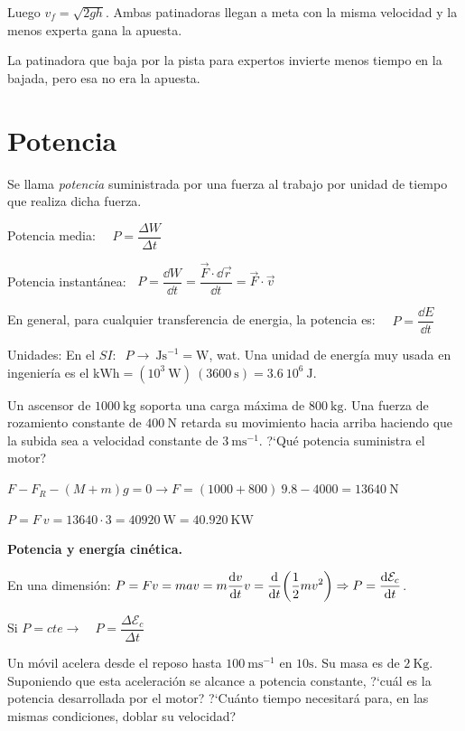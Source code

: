 Luego $v_f=\sqrt{2gh}$. Ambas patinadoras llegan a meta con la misma velocidad y la menos experta gana la apuesta.

\textcolor{gris}{La patinadora que baja por la pista para expertos invierte menos tiempo en la bajada, pero esa no era la apuesta.}

\section{Potencia}

Se llama \emph{potencia} suministrada por una fuerza al trabajo por unidad de tiempo que realiza dicha fuerza. 

Potencia media: $\quad P=\dfrac{\Delta W}{\Delta t}$

Potencia instantánea: $\;\; P=\dfrac {\dd W}{\dd t}=\dfrac {\vec F \cdot \dd \vec r}{\dd t}=\vec F \cdot \vec v$

En general, para cualquier transferencia de energia, la potencia es: $\quad P=\dfrac{\dd E}{\dd t}$

Unidades: En el $SI:\;\; P\to  \ \mathrm{J s}^{-1} = \mathrm{W}$, wat. Una unidad de energía muy usada en ingeniería es el $\mathrm{kWh}=(10^3\ \mathrm{W})\ (3600\ \mathrm{s})=3.6\ 10^6 \ \mathrm{J}$.

\begin{ejem}
Un ascensor de $1000\ \mathrm{kg}$ soporta una carga máxima de $800 \ \mathrm{kg}$. Una fuerza de rozamiento constante de $400 \ \mathrm{N}$ retarda su movimiento hacia arriba haciendo que la subida sea a velocidad constante de $3 \ \mathrm{ms}^{-1}$. ?`Qué potencia suministra el motor?	
\end{ejem}
$F-F_R-(M+m)g=0 \to F=(1000+800)\ 9.8-4000=13640\ \mathrm{N}$

$P=F\ v=13640 \cdot 3 = 40920 \ \mathrm{W}= 40.920 \ \mathrm{KW}$

\textbf{Potencia y energía cinética.}

En una dimensión: $\displaystyle P=Fv=mav = m \dv{v}{t} v =\dv{t}(\dfrac 1 2 mv^2)\Rightarrow P=\dv{\mathcal E_c}{t}$.

Si $P=cte \to \quad P=\dfrac{\Delta \mathcal E_c}{\Delta t} $

\begin{ejem}
\normalsize{Un} móvil acelera desde el reposo hasta $100	\ \mathrm{ms}^{-1}$ en $10 \mathrm{s}$. Su masa es de $2\ \mathrm{Kg}$. Suponiendo que esta aceleración se alcance a potencia constante, ?`cuál es la potencia desarrollada por el motor? ?`Cuánto tiempo necesitará para, en las mismas condiciones, doblar su velocidad?
\end{ejem}

